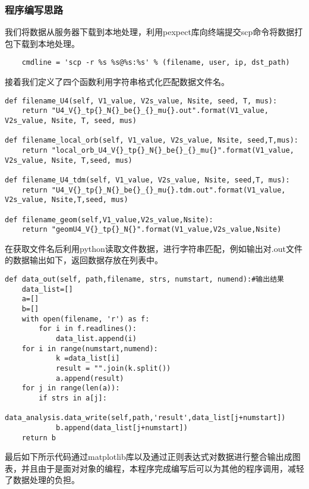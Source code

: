 \subsubsection{程序编写思路}
我们将数据从服务器下载到本地处理，利用pexpect库向终端提交scp命令将数据打包下载到本地处理。
\begin{lstlisting}
    cmdline = 'scp -r %s %s@%s:%s' % (filename, user, ip, dst_path)
\end{lstlisting}
接着我们定义了四个函数利用字符串格式化匹配数据文件名。
\begin{lstlisting}
def filename_U4(self, V1_value, V2s_value, Nsite, seed, T, mus):
    return "U4_V{}_tp{}_N{}_be{}_{}_mu{}.out".format(V1_value, V2s_value, Nsite, T, seed, mus)

def filename_local_orb(self, V1_value, V2s_value, Nsite, seed,T,mus):
    return "local_orb_U4_V{}_tp{}_N{}_be{}_{}_mu{}".format(V1_value, V2s_value, Nsite, T,seed, mus)

def filename_U4_tdm(self, V1_value, V2s_value, Nsite, seed,T, mus):
    return "U4_V{}_tp{}_N{}_be{}_{}_mu{}.tdm.out".format(V1_value, V2s_value, Nsite,T,seed, mus)

def filename_geom(self,V1_value,V2s_value,Nsite):
    return "geomU4_V{}_tp{}_N{}".format(V1_value,V2s_value,Nsite)
\end{lstlisting}
在获取文件名后利用python读取文件数据，进行字符串匹配，例如输出对.out文件的数据输出如下，返回数据存放在列表中。
\begin{lstlisting}
def data_out(self, path,filename, strs, numstart, numend):#输出结果
    data_list=[]
    a=[]
    b=[]
    with open(filename, 'r') as f:
        for i in f.readlines():
            data_list.append(i)
    for i in range(numstart,numend):
            k =data_list[i]
            result = "".join(k.split())
            a.append(result)
    for j in range(len(a)):
        if strs in a[j]:
            data_analysis.data_write(self,path,'result',data_list[j+numstart])
            b.append(data_list[j+numstart])
    return b
\end{lstlisting}
最后如下所示代码通过matplotlib库以及通过正则表达式对数据进行整合输出成图表，并且由于是面对对象的编程，本程序完成编写后可以为其他的程序调用，减轻了数据处理的负担。

